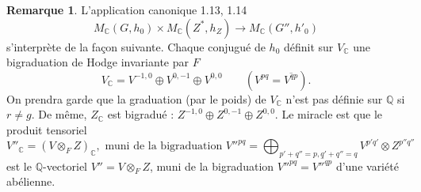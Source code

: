 \documentclass[11pt]{amsart}
\theoremstyle{plain}
\theoremstyle{definition}
\newtheorem{remark}[theorem]{Remarque}
\newcommand{\QQ}{\mathbb{Q}}
\newcommand{\CC}{\mathbb{C}}
\newcommand{\MC}{M_{\mathbb{C}}}
\begin{document}
\begin{remark}
L'application canonique 1.13, 1.14
\begin{equation}\label{eq:6.6.1}
\MC(G, h_0) \times \MC(Z^*, h_Z) \longrightarrow \MC(G'', h'_0)
\end{equation}
s'interpr\`ete de la fa\c con suivante. Chaque conjugu\'e de $h_0$ d\'efinit sur $V_{\CC}$ une bigraduation de Hodge invariante par $F$
\[
V_{\CC} = V^{-1,0} \oplus V^{0,-1} \oplus V^{0,0} \qquad (V^{pq} = \overline{V^{qp}}).
\]
On prendra garde que la graduation (par le poids) de $V_{\CC}$ n'est pas d\'efinie sur $\QQ$ si $r \neq g$. De m\^eme, $Z_{\CC}$ est bigradu\'e : $Z^{-1,0} \oplus Z^{0,-1} \oplus Z^{0,0}$. Le miracle est que le produit tensoriel
\[
V''_{\CC} = (V \otimes_F Z)_{\CC}, \text{ muni de la bigraduation } V''^{pq} = \bigoplus_{p'+q''=p, q'+q''=q} V^{p'q'} \otimes Z^{p''q''}
\]
est le $\QQ$-vectoriel $V'' = V \otimes_F Z$, muni de la bigraduation $V''^{pq} = \overline{V''^{qp}}$ d'une vari\'et\'e ab\'elienne.
\end{remark}
\end{document}
